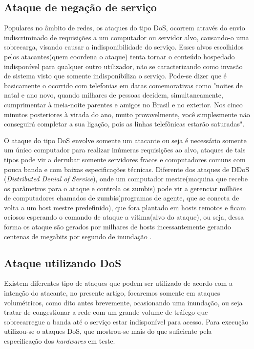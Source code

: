 \documentclass[12pt]{article}
\begin{document}
  \subsection{Ataque de negação de serviço} \label{sec:ddos}
    Populares no âmbito de redes, os ataques do tipo DoS, ocorrem através do envio indiscriminado de requisições a um computador ou servidor alvo, causando-o uma sobrecarga, visando causar a indisponibilidade do serviço. Esses alvos escolhidos pelos atacantes(quem coordena o ataque) tenta tornar o conteúdo hospedado indisponível para qualquer outro utilizador, não se caracterizando como invasão de sistema visto que somente indisponibiliza o serviço. Pode-se dizer que é basicamente o ocorrido com telefonias em datas comemorativas como "noites de natal e ano novo, quando milhares de pessoas decidem, simultaneamente, cumprimentar à meia-noite parentes e amigos no Brasil e no exterior. Nos cinco minutos posteriores à virada do ano, muito provavelmente, você simplesmente não conseguirá completar a sua ligação, pois as linhas telefônicas estarão saturadas"\cite{ddOS}.


    O ataque do tipo DoS envolve somente um atacante ou seja é necessário somente um único computador para realizar inúmeras requisições ao alvo, ataques de tais tipos pode vir a derrubar somente servidores fracos e computadores comuns com pouca banda e com baixas especificações técnicas. Diferente dos ataques de DDoS (\textit{Distributed Denial of Service}), onde um computador mestre(maquina que recebe os parâmetros para o ataque e controla os zumbis) pode vir a gerenciar milhões de computadores chamados de zumbis(programas de agente, que se conecta de volta a um host mestre predefinido), que fora plantado em hosts remotos e ficam ociosos esperando o comando de ataque a vitima(alvo do ataque), ou seja, dessa forma os ataque são gerados por milhares de hosts incessantemente gerando centenas de megabits por segundo de inundação \cite{ddOS2}. 
  
  \subsection{Ataque utilizando DoS} \label{sec:ataquedos}
    Existem diferentes tipo de ataques que podem ser utilizado de acordo com a intenção do atacante, no presente artigo, focaremos somente em ataques volumétricos, como dito antes brevemente, ocasionando uma inundação, ou seja tratar de congestionar a rede com um grande volume de tráfego que sobrecarregue a banda até o serviço estar indisponível para acesso. Para execução utilizou-se o ataques DoS, que mostrou-se mais do que suficiente pela especificação dos \textit{hardwares} em teste.
         
\end{document}
